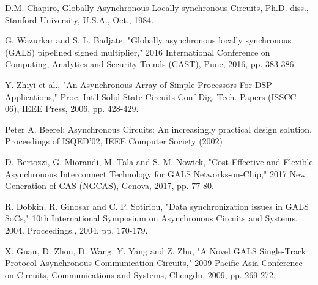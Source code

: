 \documentclass[letterpaper, 10 pt, conference]{ieeeconf}
\begin{document}
\addtolength{\textheight}{-12cm}   %


\begin{thebibliography}{99}

 D.M. Chapiro, Globally-Asynchronous Locally-synchronous Circuits, Ph.D. diss., Stanford University, U.S.A., Oct., 1984. 

 G. Wazurkar and S. L. Badjate, "Globally asynchronous locally synchronous (GALS) pipelined signed multiplier," 2016 International Conference on Computing, Analytics and Security Trends (CAST), Pune, 2016, pp. 383-386.

  Y. Zhiyi et al., "An Asynchronous Array of Simple Processors For DSP Applications," Proc. Int’l Solid-State Circuits Conf Dig. Tech. Papers (ISSCC 06), IEEE Press, 2006,
pp. 428-429.

 Peter A. Beerel: Asynchronous Circuits: An increasingly practical design solution. Proceedings of ISQED'02, IEEE Computer Society (2002)

 D. Bertozzi, G. Miorandi, M. Tala and S. M. Nowick, "Cost-Effective and Flexible Asynchronous Interconnect Technology for GALS Networks-on-Chip," 2017 New Generation of CAS (NGCAS), Genova, 2017, pp. 77-80.

 R. Dobkin, R. Ginosar and C. P. Sotiriou, "Data synchronization issues in GALS SoCs," 10th International Symposium on Asynchronous Circuits and Systems, 2004. Proceedings., 2004, pp. 170-179.

 X. Guan, D. Zhou, D. Wang, Y. Yang and Z. Zhu, "A Novel GALS Single-Track Protocol Asynchronous Communication Circuits," 2009 Pacific-Asia Conference on Circuits, Communications and Systems, Chengdu, 2009, pp. 269-272.

\end{thebibliography}
\end{document}
